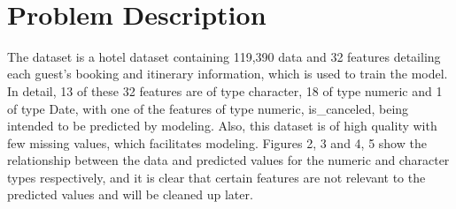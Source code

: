 \documentclass{article}
\begin{document}
\ 

\section{Problem Description}

The dataset is a hotel dataset containing 119,390 data and 32 features detailing each guest's booking and itinerary information, which is used to train the model. In detail, 13 of these 32 features are of type character, 18 of type numeric and 1 of type Date, with one of the features of type numeric, is\_canceled, being intended to be predicted by modeling. Also, this dataset is of high quality with few missing values, which facilitates modeling. Figures 2, 3 and 4, 5 show the relationship between the data and predicted values for the numeric and character types respectively, and it is clear that certain features are not relevant to the predicted values and will be cleaned up later.
\end{document}
